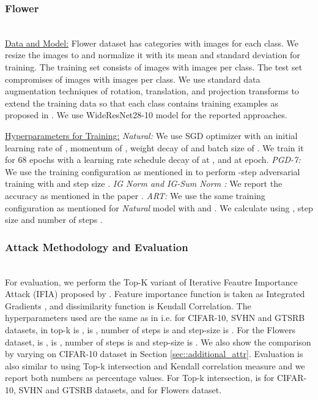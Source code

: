 \documentclass[runningheads]{llncs}
\begin{document}
\subsubsection{Flower}\hspace*{\fill} \\ 
\underline{Data and Model:} Flower dataset \cite{flower} has  categories with  images for each class. We resize the images to  and normalize it with its mean and standard deviation for training. The training set consists of  images with  images per class. The test set compromises of  images with  images per class. We use standard data augmentation techniques of rotation, translation, and projection transforms to extend the training data so that each class contains  training examples as proposed in \cite{robust_attr_nips_sal}. We use WideResNet28-10 \cite{wrn} model for the reported approaches.
\vspace{3pt}

\noindent \underline{Hyperparameters for Training:} \newline
\textit{Natural:} We use SGD optimizer with an initial learning rate of , momentum of ,  weight decay of  and batch size of . We train it for 68 epochs with a learning rate schedule decay of  at ,  and  at  epoch.
\newline
\textit{PGD-7\cite{madrypgd}:} We use the training configuration as mentioned in \cite{model_cifar} to perform -step adversarial training with  and step size .
\newline
\textit{IG Norm and IG-Sum Norm \cite{robust_attr_nips_sal} : } We report the accuracy as mentioned in the paper \cite{robust_attr_nips_sal}.
\newline
\textit{ART:} We use the same training configuration as mentioned for \textit{Natural} model with  and . We calculate  using , step size  and number of steps .  

\subsubsection{Attack Methodology and Evaluation}\label{section::attackmethodology}\hspace*{\fill} \\
For evaluation, we perform the Top-K variant of Iterative Feautre Importance Attack (IFIA) proposed by \cite{aaai_sal}. Feature importance function is taken as Integrated Gradients \cite{attr2017integrated}, and dissimilarity function is Kendall Correlation. The hyperparameters used are the same as in \cite{robust_attr_nips_sal} i.e. for CIFAR-10, SVHN and GTSRB datasets,  in top-k is ,  is , number of steps is  and step-size is . For the Flowers dataset,  is ,  is , number of steps is  and step-size is . We also show the comparison by varying  on CIFAR-10 dataset in Section \ref{sec::additional_attr}. Evaluation is also similar to \cite{robust_attr_nips_sal} using Top-k intersection and Kendall correlation measure and we report both numbers as percentage values. For Top-k intersection,  is  for CIFAR-10, SVHN and GTSRB datasets, and  for Flowers dataset.  
\end{document}
